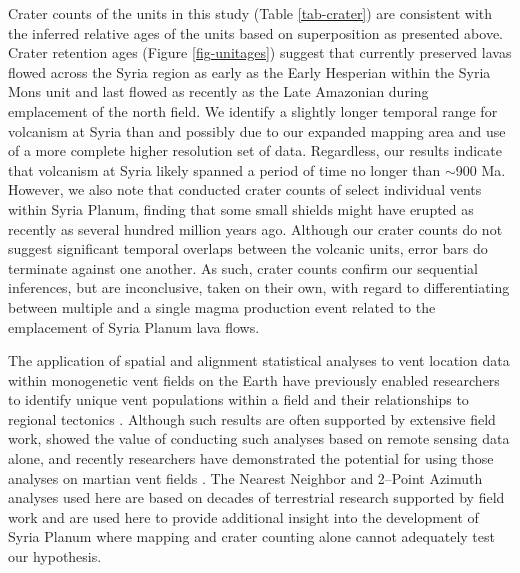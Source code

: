 Crater counts of the units in this study (Table \ref{tab-crater}) are consistent with the inferred relative ages of the units based on superposition as presented above. Crater retention ages (Figure \ref{fig-unitages}) suggest that currently preserved lavas flowed across the Syria region as early as the Early Hesperian within the Syria Mons unit and last flowed as recently as the Late Amazonian during emplacement of the north field. We identify a slightly longer temporal range for volcanism at Syria than \citet{Plescia2004} and \citet{Baptista2008} possibly due to our expanded mapping area and use of a more complete higher resolution set of data. Regardless, our results indicate that volcanism at Syria likely spanned a period of time no longer than $\sim$900 Ma. However, we also note that \citet{Hauber2011} conducted crater counts of select individual vents within Syria Planum, finding that some small shields might have erupted as recently as several hundred million years ago. Although our crater counts do not suggest significant temporal overlaps between the volcanic units, error bars do terminate against one another. As such, crater counts confirm our sequential inferences, but are inconclusive, taken on their own, with regard to differentiating between multiple and a single magma production event related to the emplacement of Syria Planum lava flows. 

The application of spatial and alignment statistical analyses to vent location data within monogenetic vent fields on the Earth have previously enabled researchers to identify unique vent populations within a field and their relationships to regional tectonics \citep[e.g.]{Connor2000}. Although such results are often supported by extensive field work, \citet{Bishop2007} showed the value of conducting such analyses based on remote sensing data alone, and recently researchers have demonstrated the potential for using those analyses on martian vent fields \citep{Bishop2008,Bleacher2009,Hamilton2010,Hamilton2011}. The Nearest Neighbor and 2--Point Azimuth analyses used here are based on decades of terrestrial research supported by field work and are used here to provide additional insight into the development of Syria Planum where mapping and crater counting alone cannot adequately test our hypothesis. 

